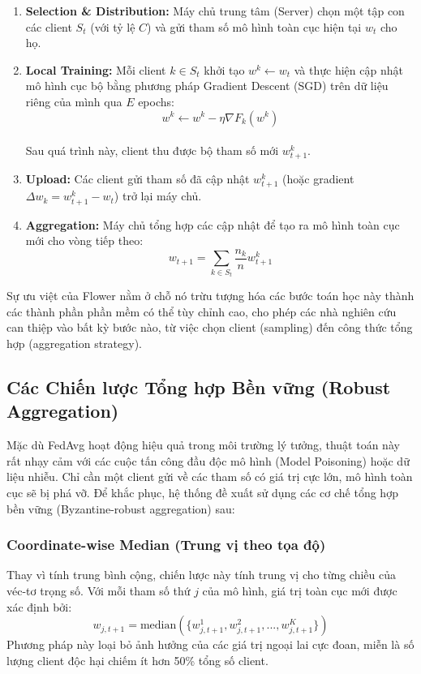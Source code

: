 \begin{enumerate}
    \item \textbf{Selection \& Distribution:} Máy chủ trung tâm (Server) chọn một tập con các client $S_t$ (với tỷ lệ $C$) và gửi tham số mô hình toàn cục hiện tại $w_t$ cho họ.
    
    \item \textbf{Local Training:} Mỗi client $k \in S_t$ khởi tạo $w^k \leftarrow w_t$ và thực hiện cập nhật mô hình cục bộ bằng phương pháp Gradient Descent (SGD) trên dữ liệu riêng của mình qua $E$ epochs: \\
    $$w^k \leftarrow w^k - \eta \nabla F_k(w^k)$$ \\
    Sau quá trình này, client thu được bộ tham số mới $w_{t+1}^k$.
    
    \item \textbf{Upload:} Các client gửi tham số đã cập nhật $w_{t+1}^k$ (hoặc gradient $\Delta w_k = w_{t+1}^k - w_t$) trở lại máy chủ.
    
    \item \textbf{Aggregation:} Máy chủ tổng hợp các cập nhật để tạo ra mô hình toàn cục mới cho vòng tiếp theo: \\
    $$w_{t+1} = \sum_{k \in S_t} \frac{n_k}{n} w_{t+1}^k$$
\end{enumerate}
Sự ưu việt của Flower nằm ở chỗ nó trừu tượng hóa các bước toán học này thành các thành phần phần mềm có thể tùy chỉnh cao, cho phép các nhà nghiên cứu can thiệp vào bất kỳ bước nào, từ việc chọn client (sampling) đến công thức tổng hợp (aggregation strategy).

\subsection{Các Chiến lược Tổng hợp Bền vững (Robust Aggregation)}

Mặc dù FedAvg hoạt động hiệu quả trong môi trường lý tưởng, thuật toán này rất nhạy cảm với các cuộc tấn công đầu độc mô hình (Model Poisoning) hoặc dữ liệu nhiễu. Chỉ cần một client gửi về các tham số có giá trị cực lớn, mô hình toàn cục sẽ bị phá vỡ. Để khắc phục, hệ thống đề xuất sử dụng các cơ chế tổng hợp bền vững (Byzantine-robust aggregation) sau:

\subsubsection{Coordinate-wise Median (Trung vị theo tọa độ)}
Thay vì tính trung bình cộng, chiến lược này tính trung vị cho từng chiều của véc-tơ trọng số.
Với mỗi tham số thứ $j$ của mô hình, giá trị toàn cục mới được xác định bởi:
$$w_{j, t+1} = \text{median}(\{w_{j, t+1}^1, w_{j, t+1}^2, ..., w_{j, t+1}^K\})$$
Phương pháp này loại bỏ ảnh hưởng của các giá trị ngoại lai cực đoan, miễn là số lượng client độc hại chiếm ít hơn 50\% tổng số client.

